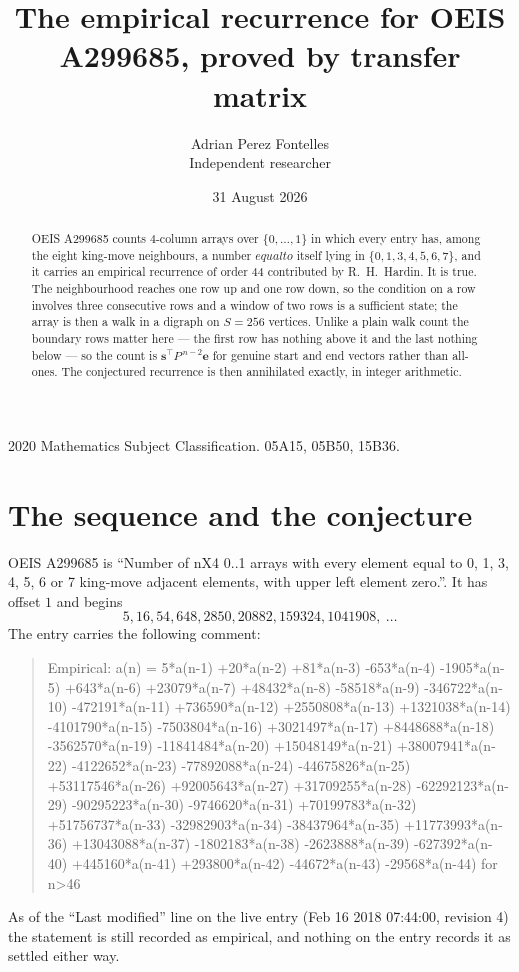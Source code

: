 \documentclass[11pt,a4paper]{article}
\title{The empirical recurrence for OEIS A299685, proved by transfer matrix}
\author{Adrian Perez Fontelles\\ \small Independent researcher}
\date{31 August 2026}
\theoremstyle{plain}
\theoremstyle{definition}
\begin{document}
\maketitle

\begin{abstract}
OEIS A299685 counts $4$-column arrays over $\{0,\dots,1\}$ in which every entry has,
among the eight king-move neighbours, a number $equal to$ itself lying in $\{0,1,3,4,5,6,7\}$, and it carries an empirical
recurrence of order $44$ contributed by R.~H.~Hardin. It is true. The neighbourhood
reaches one row up and one row down, so the condition on a row involves three consecutive
rows and a window of two rows is a sufficient state; the array is then a walk in a digraph
on $S=256$ vertices. Unlike a plain walk count the boundary rows matter here --- the first
row has nothing above it and the last nothing below --- so the count is
$\mathbf{s}^{\!\top}P^{\,n-2}\mathbf{e}$ for genuine start and end vectors rather than
all-ones. The conjectured recurrence is then annihilated exactly, in integer arithmetic.
\end{abstract}

\noindent\small 2020 Mathematics Subject Classification. 05A15, 05B50, 15B36.\normalsize

\section{The sequence and the conjecture}

OEIS A299685 is ``Number of nX4 0..1 arrays with every element equal to 0, 1, 3, 4, 5, 6 or 7 king-move adjacent elements, with upper left element zero.''. It has offset
$1$ and begins
\[
5, 16, 54, 648, 2850, 20882, 159324, 1041908,\ \dots
\]
The entry carries the following comment:
\begin{quote}\small
Empirical: a(n) = 5*a(n-1) +20*a(n-2) +81*a(n-3) -653*a(n-4) -1905*a(n-5) +643*a(n-6) +23079*a(n-7) +48432*a(n-8) -58518*a(n-9) -346722*a(n-10) -472191*a(n-11) +736590*a(n-12) +2550808*a(n-13) +1321038*a(n-14) -4101790*a(n-15) -7503804*a(n-16) +3021497*a(n-17) +8448688*a(n-18) -3562570*a(n-19) -11841484*a(n-20) +15048149*a(n-21) +38007941*a(n-22) -4122652*a(n-23) -77892088*a(n-24) -44675826*a(n-25) +53117546*a(n-26) +92005643*a(n-27) +31709255*a(n-28) -62292123*a(n-29) -90295223*a(n-30) -9746620*a(n-31) +70199783*a(n-32) +51756737*a(n-33) -32982903*a(n-34) -38437964*a(n-35) +11773993*a(n-36) +13043088*a(n-37) -1802183*a(n-38) -2623888*a(n-39) -627392*a(n-40) +445160*a(n-41) +293800*a(n-42) -44672*a(n-43) -29568*a(n-44) for n>46
\end{quote}
As of the ``Last modified'' line on the live entry (Feb 16 2018 07:44:00, revision
4) the statement is still recorded as empirical, and nothing on the entry
records it as settled either way.
\end{document}
